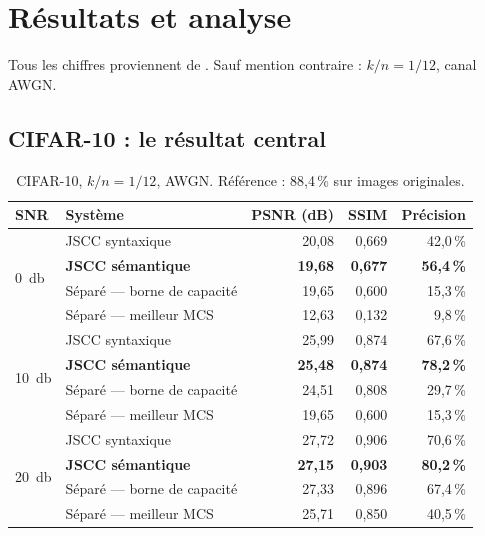 \chapter{Résultats et analyse}
\label{chap:resultats}

Tous les chiffres proviennent de . Sauf mention contraire : $k/n = 1/12$, canal AWGN.

\section{CIFAR-10 : le résultat central}
\label{sec:res_cifar}

\begin{table}[H]
\centering
\caption{CIFAR-10, $k/n = 1/12$, AWGN. Référence : 88,4\,\% sur images originales.}
\label{tab:cifar}
\small
\begin{tabular}{@{}llrrr@{}}
\toprule
\textbf{SNR} & \textbf{Système} & \textbf{PSNR (dB)} & \textbf{SSIM} & \textbf{Précision} \\
\midrule
\multirow{4}{*}{\SI{0}{\decibel}}
 & JSCC syntaxique            & 20,08 & 0,669 & 42,0\,\% \\
 & \textbf{JSCC sémantique}   & \textbf{19,68} & \textbf{0,677} & \textbf{56,4\,\%} \\
 & Séparé — borne de capacité & 19,65 & 0,600 & 15,3\,\% \\
 & Séparé — meilleur MCS      & 12,63 & 0,132 & 9,8\,\% \\
\midrule
\multirow{4}{*}{\SI{10}{\decibel}}
 & JSCC syntaxique            & 25,99 & 0,874 & 67,6\,\% \\
 & \textbf{JSCC sémantique}   & \textbf{25,48} & \textbf{0,874} & \textbf{78,2\,\%} \\
 & Séparé — borne de capacité & 24,51 & 0,808 & 29,7\,\% \\
 & Séparé — meilleur MCS      & 19,65 & 0,600 & 15,3\,\% \\
\midrule
\multirow{4}{*}{\SI{20}{\decibel}}
 & JSCC syntaxique            & 27,72 & 0,906 & 70,6\,\% \\
 & \textbf{JSCC sémantique}   & \textbf{27,15} & \textbf{0,903} & \textbf{80,2\,\%} \\
 & Séparé — borne de capacité & 27,33 & 0,896 & 67,4\,\% \\
 & Séparé — meilleur MCS      & 25,71 & 0,850 & 40,5\,\% \\
\bottomrule
\end{tabular}
\end{table}

